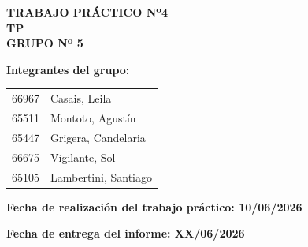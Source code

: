 \begin{center}
    
    {\large \textbf{TRABAJO PRÁCTICO Nº4}}\\[0.5cm]
    
    {\Large \textbf{TP }}\\[1cm]
    
    {\normalsize \textbf{GRUPO Nº 5}}\\[0.5cm]

\end{center}

\vspace{0.5cm}

\textbf{Integrantes del grupo:}

\vspace{0.3cm}

\begin{tabular}{p{5cm} p{8cm}}
66967 & Casais, Leila \\
65511 & Montoto, Agustín \\
65447 & Grigera, Candelaria\\
66675 & Vigilante, Sol \\
65105 & Lambertini, Santiago \\
\end{tabular}

\vspace{0.8cm}

\textbf{Fecha de realización del trabajo práctico: 10/06/2026} \\
\vspace{0.3cm}

\textbf{Fecha de entrega del informe: XX/06/2026}

\vspace{1cm}

\newpage
